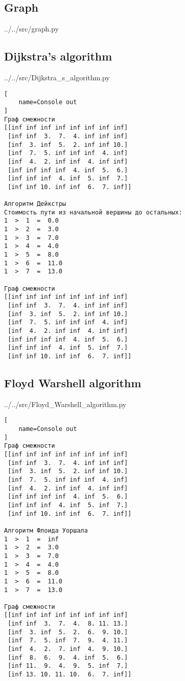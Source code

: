 \newpage

\subsection{Graph}


{../../src/graph.py}

\newpage

\subsection{Dijkstra's algorithm}


{../../src/Dijkstra_s_algorithm.py}

\begin{lstlisting}[
    name=Console out
]
Граф смежности
[[inf inf inf inf inf inf inf inf]
 [inf inf  3.  7.  4. inf inf inf]
 [inf  3. inf  5.  2. inf inf 10.]
 [inf  7.  5. inf inf inf  4. inf]
 [inf  4.  2. inf inf  4. inf inf]
 [inf inf inf inf  4. inf  5.  6.]
 [inf inf inf  4. inf  5. inf  7.]
 [inf inf 10. inf inf  6.  7. inf]]

Алгоритм Дейкстры
Стоимость пути из начальной вершины до остальных:
1  >  1  =  0.0
1  >  2  =  3.0
1  >  3  =  7.0
1  >  4  =  4.0
1  >  5  =  8.0
1  >  6  =  11.0
1  >  7  =  13.0

Граф смежности
[[inf inf inf inf inf inf inf inf]
 [inf inf  3.  7.  4. inf inf inf]
 [inf  3. inf  5.  2. inf inf 10.]
 [inf  7.  5. inf inf inf  4. inf]
 [inf  4.  2. inf inf  4. inf inf]
 [inf inf inf inf  4. inf  5.  6.]
 [inf inf inf  4. inf  5. inf  7.]
 [inf inf 10. inf inf  6.  7. inf]]
\end{lstlisting}

\newpage

\subsection{Floyd Warshell algorithm}


{../../src/Floyd_Warshell_algorithm.py}

\begin{lstlisting}[
    name=Console out
]
Граф смежности
[[inf inf inf inf inf inf inf inf]
 [inf inf  3.  7.  4. inf inf inf]
 [inf  3. inf  5.  2. inf inf 10.]
 [inf  7.  5. inf inf inf  4. inf]
 [inf  4.  2. inf inf  4. inf inf]
 [inf inf inf inf  4. inf  5.  6.]
 [inf inf inf  4. inf  5. inf  7.]
 [inf inf 10. inf inf  6.  7. inf]]

Алгоритм Флоида Уоршала
1  >  1  =  inf
1  >  2  =  3.0
1  >  3  =  7.0
1  >  4  =  4.0
1  >  5  =  8.0
1  >  6  =  11.0
1  >  7  =  13.0

Граф смежности
[[inf inf inf inf inf inf inf inf]
 [inf inf  3.  7.  4.  8. 11. 13.]
 [inf  3. inf  5.  2.  6.  9. 10.]
 [inf  7.  5. inf  7.  9.  4. 11.]
 [inf  4.  2.  7. inf  4.  9. 10.]
 [inf  8.  6.  9.  4. inf  5.  6.]
 [inf 11.  9.  4.  9.  5. inf  7.]
 [inf 13. 10. 11. 10.  6.  7. inf]]
\end{lstlisting}

